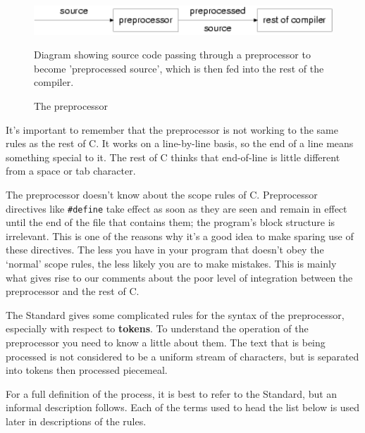   \begin{figure}[htb]\centering
     \includegraphics[type=pdf,read=.pdf,ext=.pdf,scale=0.8]
     {figure/7.1_preProc}
     \caption*{Diagram showing source code
       passing through a preprocessor to become 'preprocessed source',
       which is then fed into the rest of the compiler.}
     \caption{\label{fig:preProc}The preprocessor}
   \end{figure}



  It's important to remember that the preprocessor is not working to the
   same rules as the rest of C. It works on a line-by-line basis, so the end
   of a line means something special to it. The rest of C thinks that
   end-of-line is little different from a space or tab character.


  The preprocessor doesn't know about the scope rules of C. Preprocessor
   directives like \texttt{\#define} take effect as soon as they are seen
   and remain in effect until the end of the file that contains them; the
   program's block structure is irrelevant. This is one of the reasons why
   it's a good idea to make sparing use of these directives. The less you
   have in your program that doesn't obey the `normal' scope rules,
   the less likely you are to make mistakes. This is mainly what gives rise
   to our comments about the poor level of integration between the
   preprocessor and the rest of C.


  The Standard gives some complicated rules for the syntax of the
   preprocessor, especially with respect to \textbf{tokens}. To understand
   the operation of the preprocessor you need to know a little about them.
   The text that is being processed is not considered to be a uniform stream
   of characters, but is separated into tokens then processed piecemeal.


  For a full definition of the process, it is best to refer to the
   Standard, but an informal description follows. Each of the terms used to
   head the list below is used later in descriptions of the rules.


